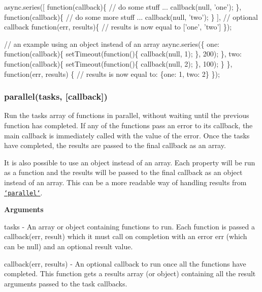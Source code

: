 \begin{DoxyCode}
async.series([
    \textcolor{keyword}{function}(callback)\{
        \textcolor{comment}{// do some stuff ...}
        callback(null, \textcolor{stringliteral}{'one'});
    \},
    \textcolor{keyword}{function}(callback)\{
        \textcolor{comment}{// do some more stuff ...}
        callback(null, \textcolor{stringliteral}{'two'});
    \}
],
\textcolor{comment}{// optional callback}
\textcolor{keyword}{function}(err, results)\{
    \textcolor{comment}{// results is now equal to ['one', 'two']}
\});


\textcolor{comment}{// an example using an object instead of an array}
async.series(\{
    one: \textcolor{keyword}{function}(callback)\{
        setTimeout(\textcolor{keyword}{function}()\{
            callback(null, 1);
        \}, 200);
    \},
    two: \textcolor{keyword}{function}(callback)\{
        setTimeout(\textcolor{keyword}{function}()\{
            callback(null, 2);
        \}, 100);
    \}
\},
\textcolor{keyword}{function}(err, results) \{
    \textcolor{comment}{// results is now equal to: \{one: 1, two: 2\}}
\});
\end{DoxyCode}
 



\label{_parallel}%
 \subsubsection*{parallel(tasks, \mbox{[}callback\mbox{]})}

Run the {\ttfamily tasks} array of functions in parallel, without waiting until the previous function has completed. If any of the functions pass an error to its callback, the main {\ttfamily callback} is immediately called with the value of the error. Once the {\ttfamily tasks} have completed, the results are passed to the final {\ttfamily callback} as an array.

It is also possible to use an object instead of an array. Each property will be run as a function and the results will be passed to the final {\ttfamily callback} as an object instead of an array. This can be a more readable way of handling results from \href{#parallel}{\tt `parallel`}.

{\bfseries Arguments}


\begin{DoxyItemize}
\item {\ttfamily tasks} -\/ An array or object containing functions to run. Each function is passed a {\ttfamily callback(err, result)} which it must call on completion with an error {\ttfamily err} (which can be {\ttfamily null}) and an optional {\ttfamily result} value.
\item {\ttfamily callback(err, results)} -\/ An optional callback to run once all the functions have completed. This function gets a results array (or object) containing all the result arguments passed to the task callbacks.
\end{DoxyItemize}

